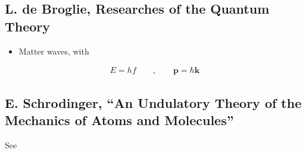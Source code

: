 \documentclass[letterpaper,10pt,english]{jupyterBook}
\begin{document}
\subsection{L. de Broglie, Researches of the Quantum Theory}
\label{\detokenize{ch/quantum-mechanics/history/de-broglie:l-de-broglie-researches-of-the-quantum-theory}}\label{\detokenize{ch/quantum-mechanics/history/de-broglie:quantum-mehcanics-history-wave-mechanics-de-broglie}}\label{\detokenize{ch/quantum-mechanics/history/de-broglie::doc}}\begin{itemize}
\item {} 
\sphinxAtStartPar
Matter waves, with

\end{itemize}
\begin{equation*}
\begin{split}E = h f \qquad , \qquad \mathbf{p} = \hbar \mathbf{k}\end{split}
\end{equation*}
\sphinxstepscope


\subsection{E. Schrodinger, “An Undulatory Theory of the Mechanics of Atoms and Molecules”}
\label{\detokenize{ch/quantum-mechanics/history/schrodinger:e-schrodinger-an-undulatory-theory-of-the-mechanics-of-atoms-and-molecules}}\label{\detokenize{ch/quantum-mechanics/history/schrodinger:quantum-mehcanics-history-wave-mechanics-schrodinger}}\label{\detokenize{ch/quantum-mechanics/history/schrodinger::doc}}
\sphinxAtStartPar
See {\hyperref[\detokenize{ch/quantum-mechanics/wave-mechanics:quantum-mechanics-wave-mechanics}]{}}

\sphinxstepscope
\end{document}
